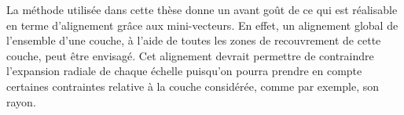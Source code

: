 \medskip

La m\'ethode utilis\'ee dans cette th\`ese donne un avant goût de ce qui est r\'ealisable en terme d'alignement gr\^ace aux mini-vecteurs. En effet, un alignement global de l'ensemble d'une couche, \`a l'aide de toutes les zones de recouvrement de cette couche, peut \^etre envisag\'e. Cet alignement devrait permettre de contraindre l'expansion radiale de chaque \'echelle puisqu'on pourra prendre en compte certaines contraintes relative \`a la couche consid\'er\'ee, comme par exemple, son rayon.



